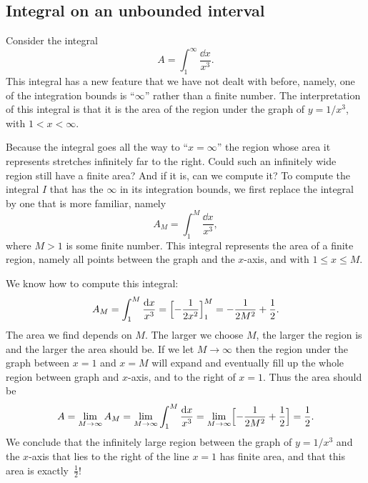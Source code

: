 \subsection{Integral on an unbounded interval} %
\label{sec:01improper1}
Consider the integral
\[
A = \int_1^\infty \frac{\dd x} {x^3}.
\]
This integral has a new feature that we have not dealt with before, namely, one
of the integration bounds is ``$\infty$'' rather than a finite number.  The
interpretation of this integral is that it is the area of the region under the
graph of $y=1/x^3$, with $1<x<\infty$.
\begin{center}
  
\end{center}
Because the integral goes all the way to ``$x=\infty$'' the region whose area it
represents stretches infinitely far to the right.  Could such an infinitely wide
region still have a finite area?  And if it is, can we compute it?  To compute
the integral $I$ that has the $\infty$ in its integration bounds, we first
replace the integral by one that is more familiar, namely
\[
A_M = \int_1^M \frac{\dd x} {x^3},
\]
where $M>1$ is some finite number.  This integral represents the area of a
finite region, namely all points between the graph and the $x$-axis, and with
$1\leq x\leq M$.
\begin{center}
  
\end{center}
We know how to compute this integral:
\[
A_M = \int_1^M\frac{\mathrm{d} x} {x^3} =\Bigl[-\frac{1} {2x^2}\Bigr]_1^M = -\frac{1}
{2M^2} + \frac{1} {2}.
\]
The area we find depends on $M$.  The larger we choose $M$, the larger the
region is and the larger the area should be.  If we let $M\to\infty$ then the
region under the graph between $x=1$ and $x=M$ will expand and eventually fill up
the whole region between graph and $x$-axis, and to the right of $x=1$.  Thus
the area should be
\[
A = \lim_{M\to \infty} A_M = \lim_{M\to \infty} \int_1^M \frac{\mathrm{d} x} {x^3}
=\lim_{M\to\infty} \Bigl[ -\frac{1} {2M^2} + \frac{1} {2} \Bigr] =\frac{1} {2}.
\]
We conclude that the infinitely large region between the graph of $y=1/x^3$ and
the $x$-axis that lies to the right of the line $x=1$ has finite area, and that
this area is exactly~$\frac12$!

